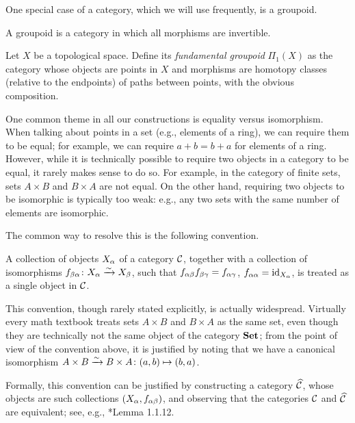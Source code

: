 One special case of a category, which we will use frequently, is a groupoid.
\begin{definition}
  A groupoid is a category in which all morphisms are invertible.
\end{definition}
\begin{example}\label{x:fundamental-groupoid}
  Let $X$ be a topological space. Define its \emph{fundamental
  groupoid} $\Pi_1(X)$ as the category whose objects
  are points in $X$ and morphisms are homotopy classes (relative to the
  endpoints) of paths between points, with the obvious composition.
\end{example}

One common theme in all our constructions is equality versus isomorphism. When
talking about points in a set (e.g., elements of a ring), we can require them to
be equal; for example, we can require $a+b=b+a$ for elements of a ring. However,
while it is technically possible to require two objects in a category to be
equal, it rarely makes sense to do so. For example, in the category of finite
sets, sets $A\times B$ and $B\times A$ are not equal. On the other hand,
requiring two objects to be isomorphic is typically too weak: e.g., any two sets
with the same number of elements are isomorphic.

The common way to resolve this is the following convention.
\begin{convention}\label{conv:canonical}
  A collection of objects $X_\alpha$ of a category $\mathcal{C}$, together with a
  collection of isomorphisms $f_{\beta\alpha}\colon X_\alpha \xrightarrow{\sim} X_\beta$, such that
  $f_{\alpha\beta}f_{\beta\gamma}=f_{\alpha\gamma}$, $f_{\alpha\alpha}=\operatorname{id}_{X_\alpha}$, is treated as a
  single object in $\mathcal{C}$.
\end{convention}
This convention, though rarely stated explicitly, is actually widespread.
Virtually every math textbook treats sets $A\times B$ and $B\times A$ as the
same set, even though they are technically not the same object of the category
$\mathbf{Set}$; from the point of view of the convention above, it is justified by
noting that we have a canonical isomorphism $A\times B\xrightarrow{\sim} B\times A\colon
(a,b)\mapsto (b,a)$.

Formally, this convention can be justified by constructing a category
$\widehat{\mathcal{C}}$, whose objects are such collections $(X_\alpha, f_{\alpha\beta})$, and
observing that the categories $\mathcal{C}$ and $\widehat{\mathcal{C}}$ are equivalent; see,
e.g., *{Lemma 1.1.12}.


